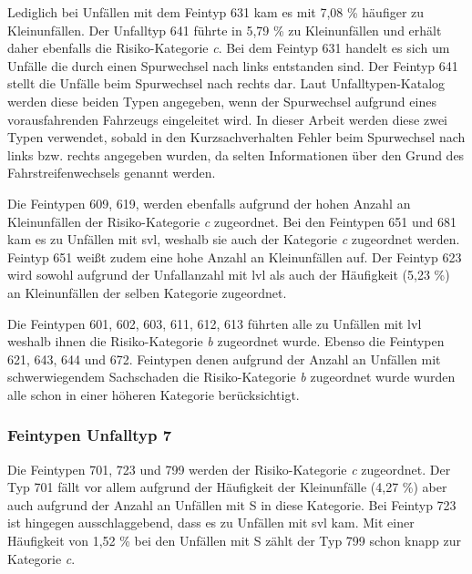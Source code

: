 Lediglich bei Unfällen mit dem Feintyp 631 kam es mit 7,08 \% häufiger zu Kleinunfällen. Der Unfalltyp 641 führte in 5,79 \% zu Kleinunfällen und erhält daher ebenfalls die Risiko-Kategorie \textit{c}. Bei dem Feintyp 631 handelt es sich um Unfälle die durch einen Spurwechsel nach links entstanden sind. Der Feintyp 641 stellt die Unfälle beim Spurwechsel nach rechts dar. Laut Unfalltypen-Katalog werden diese beiden Typen angegeben, wenn der Spurwechsel aufgrund eines vorausfahrenden Fahrzeugs eingeleitet wird. In dieser Arbeit werden diese zwei Typen verwendet, sobald in den Kurzsachverhalten Fehler beim Spurwechsel nach links bzw. rechts angegeben wurden, da selten Informationen über den Grund des Fahrstreifenwechsels genannt werden.  

Die Feintypen 609, 619, werden ebenfalls aufgrund der hohen Anzahl an Kleinunfällen der Risiko-Kategorie \textit{c} zugeordnet. Bei den Feintypen 651 und 681 kam es zu Unfällen mit \ac{svl}, weshalb sie auch der Kategorie \textit{c} zugeordnet werden. Feintyp 651 weißt zudem eine hohe Anzahl an Kleinunfällen auf. Der Feintyp 623 wird sowohl aufgrund der Unfallanzahl mit \ac{lvl} als auch der Häufigkeit (5,23 \%) an Kleinunfällen der selben Kategorie zugeordnet.

Die Feintypen 601, 602, 603, 611, 612, 613 führten alle zu Unfällen mit \ac{lvl} weshalb ihnen die Risiko-Kategorie \textit{b} zugeordnet wurde. Ebenso die Feintypen 621, 643, 644 und 672. Feintypen denen aufgrund der Anzahl an Unfällen mit schwerwiegendem Sachschaden die Risiko-Kategorie \textit{b} zugeordnet wurde wurden alle schon in einer höheren Kategorie berücksichtigt.   

\subsubsection{Feintypen Unfalltyp 7}
Die Feintypen 701, 723 und 799 werden der Risiko-Kategorie \textit{c} zugeordnet. Der Typ 701 fällt vor allem aufgrund der Häufigkeit der Kleinunfälle (4,27 \%) aber auch aufgrund der Anzahl an Unfällen mit \ac{S} in diese Kategorie. Bei Feintyp 723 ist hingegen ausschlaggebend, dass es zu Unfällen mit \ac{svl} kam. Mit einer Häufigkeit von 1,52 \% bei den Unfällen mit \ac{S} zählt der Typ 799 schon knapp zur Kategorie \textit{c}.

